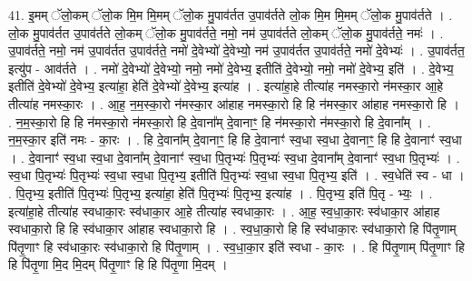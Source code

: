 \documentclass[17pt]{extarticle}
\begin{document}
41. इ॒मम् ॅलो॒कम् ॅलो॒क मि॒म मि॒मम् ॅलो॒क मु॒पाव॑र्तत उ॒पाव॑र्तते लो॒क मि॒म मि॒मम् ॅलो॒क मु॒पाव॑र्तते । . लो॒क मु॒पाव॑र्तत उ॒पाव॑र्तते लो॒कम् ॅलो॒क मु॒पाव॑र्तते॒ नमो॒ नम॑ उ॒पाव॑र्तते लो॒कम् ॅलो॒क मु॒पाव॑र्तते॒ नमः॑ । . उ॒पाव॑र्तते॒ नमो॒ नम॑ उ॒पाव॑र्तत उ॒पाव॑र्तते॒ नमो॑ दे॒वेभ्यो॑ दे॒वेभ्यो॒ नम॑ उ॒पाव॑र्तत उ॒पाव॑र्तते॒ नमो॑ दे॒वेभ्यः॑ । . उ॒पाव॑र्तत॒ इत्यु॑प - आव॑र्तते । . नमो॑ दे॒वेभ्यो॑ दे॒वेभ्यो॒ नमो॒ नमो॑ दे॒वेभ्य॒ इतीति॑ दे॒वेभ्यो॒ नमो॒ नमो॑ दे॒वेभ्य॒ इति॑ । . दे॒वेभ्य॒ इतीति॑ दे॒वेभ्यो॑ दे॒वेभ्य॒ इत्या॑हा॒ हेति॑ दे॒वेभ्यो॑ दे॒वेभ्य॒ इत्या॑ह । . इत्या॑हा॒हे तीत्या॑ह नमस्का॒रो न॑मस्का॒र आ॒हे तीत्या॑ह नमस्का॒रः । . आ॒ह॒ न॒म॒स्का॒रो न॑मस्का॒र आ॑हाह नमस्का॒रो हि हि न॑मस्का॒र आ॑हाह नमस्का॒रो हि । . न॒म॒स्का॒रो हि हि न॑मस्का॒रो न॑मस्का॒रो हि दे॒वाना᳚म् दे॒वानाꣳ॒॒ हि न॑मस्का॒रो न॑मस्का॒रो हि दे॒वाना᳚म् । . न॒म॒स्का॒र इति॑ नमः - का॒रः । . हि दे॒वाना᳚म् दे॒वानाꣳ॒॒ हि हि दे॒वानाꣳ॑ स्व॒धा स्व॒धा दे॒वानाꣳ॒॒ हि हि दे॒वानाꣳ॑ स्व॒धा । . दे॒वानाꣳ॑ स्व॒धा स्व॒धा दे॒वाना᳚म् दे॒वानाꣳ॑ स्व॒धा पि॒तृभ्यः॑ पि॒तृभ्यः॑ स्व॒धा दे॒वाना᳚म् दे॒वानाꣳ॑ स्व॒धा पि॒तृभ्यः॑ । . स्व॒धा पि॒तृभ्यः॑ पि॒तृभ्यः॑ स्व॒धा स्व॒धा पि॒तृभ्य॒ इतीति॑ पि॒तृभ्यः॑ स्व॒धा स्व॒धा पि॒तृभ्य॒ इति॑ । . स्व॒धेति॑ स्व - धा । . पि॒तृभ्य॒ इतीति॑ पि॒तृभ्यः॑ पि॒तृभ्य॒ इत्या॑हा॒ हेति॑ पि॒तृभ्यः॑ पि॒तृभ्य॒ इत्या॑ह । . पि॒तृभ्य॒ इति॑ पि॒तृ - भ्यः॒ । . इत्या॑हा॒हे तीत्या॑ह स्वधाका॒रः स्व॑धाका॒र आ॒हे तीत्या॑ह स्वधाका॒रः । . आ॒ह॒ स्व॒धा॒का॒रः स्व॑धाका॒र आ॑हाह स्वधाका॒रो हि हि स्व॑धाका॒र आ॑हाह स्वधाका॒रो हि । . स्व॒धा॒का॒रो हि हि स्व॑धाका॒रः स्व॑धाका॒रो हि पि॑तृ॒णाम् पि॑तृ॒णाꣳ हि स्व॑धाका॒रः स्व॑धाका॒रो हि पि॑तृ॒णाम् । . स्व॒धा॒का॒र इति॑ स्वधा - का॒रः । . हि पि॑तृ॒णाम् पि॑तृ॒णाꣳ हि हि पि॑तृ॒णा मि॒द मि॒दम् पि॑तृ॒णाꣳ हि हि पि॑तृ॒णा मि॒दम् । \newline
\pagebreak
{}
\end{document}
